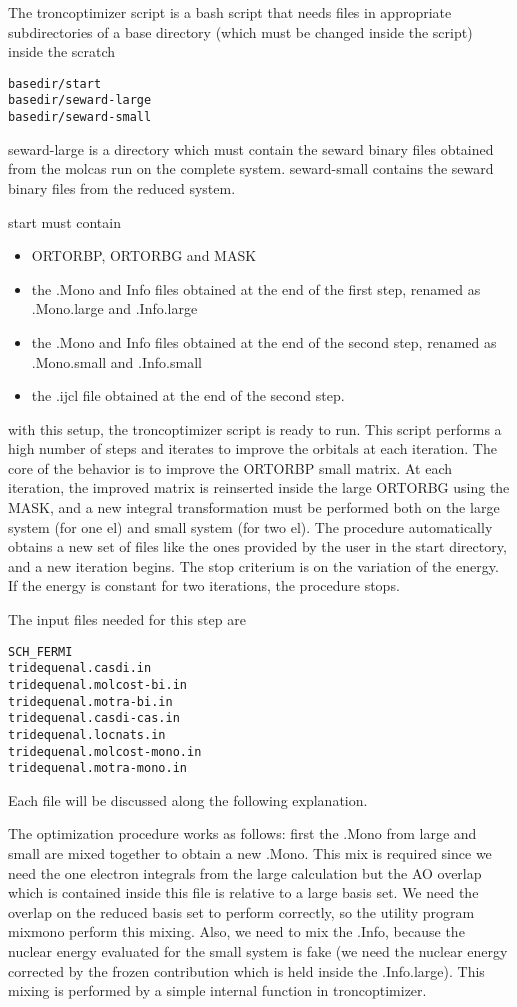 \documentclass[11pt,a4paper]{article}
\begin{document}
The troncoptimizer script is a bash script that needs files in appropriate
subdirectories of a base directory (which must be changed inside the script)
inside the scratch

\begin{verbatim}
basedir/start
basedir/seward-large
basedir/seward-small
\end{verbatim}

seward-large is a directory which must contain the seward binary files obtained from the
molcas run on the complete system. seward-small contains the seward  binary files
from the reduced system.

start must contain
\begin{itemize}
\item ORTORBP, ORTORBG and MASK
\item the .Mono and Info files obtained at the end of the first step,
renamed as .Mono.large and .Info.large
\item the .Mono and Info files obtained at the end of the second step,
renamed as .Mono.small and .Info.small
\item the .ijcl file obtained at the end of the second step.
\end{itemize}

with this setup, the troncoptimizer script is ready to run. This script
performs a high number of steps and iterates to improve the orbitals at each
iteration. The core of the behavior is to improve the ORTORBP small
matrix. At each iteration, the improved matrix is reinserted inside the
large ORTORBG using the MASK, and a new integral transformation must be
performed both on the large system (for one el) and small system (for two
el). The procedure automatically obtains a new set of files like the ones
provided by the user in the start directory, and a new iteration begins. The
stop criterium is on the variation of the energy. If the energy is constant
for two iterations, the procedure stops.

The input files needed for this step are
\begin{verbatim}
SCH_FERMI
tridequenal.casdi.in
tridequenal.molcost-bi.in
tridequenal.motra-bi.in
tridequenal.casdi-cas.in
tridequenal.locnats.in
tridequenal.molcost-mono.in
tridequenal.motra-mono.in
\end{verbatim}

Each file will be discussed along the following explanation.

The optimization procedure works as follows: first the .Mono from large and
small are mixed together to obtain a new .Mono. This mix is required since
we need the one electron integrals from the large calculation but the
AO overlap which is contained inside this file is relative to a large basis
set. We need the overlap on the reduced basis set to perform correctly, so
the utility program mixmono perform this mixing.
Also, we need to mix the .Info, because the nuclear energy evaluated for the
small system is fake (we need the nuclear energy corrected by the frozen
contribution which is held inside the .Info.large). This mixing is performed
by a simple internal function in troncoptimizer.
\end{document}
